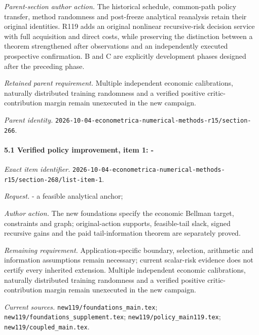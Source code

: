 \emph{Parent-section author action.} The historical schedule, common-path policy transfer, method randomness and post-freeze analytical reanalysis retain their original identities. R119 adds an original nonlinear recursive-risk decision service with full acquisition and direct costs, while preserving the distinction between a theorem strengthened after observations and an independently executed prospective confirmation. B and C are explicitly development phases designed after the preceding phase.

\par\emph{Retained parent requirement.} Multiple independent economic calibrations, naturally distributed training randomness and a verified positive critic-contribution margin remain unexecuted in the new campaign.

\par\emph{Parent identity.} \nolinkurl{2026-10-04-econometrica-numerical-methods-r15/section-266}.

\paragraph{5.1 Verified policy improvement, item 1: -}

\emph{Exact item identifier.} \nolinkurl{2026-10-04-econometrica-numerical-methods-r15/section-268/list-item-1}.

\par\emph{Request.} - a feasible analytical anchor;

\par\emph{Author action.} The new foundations specify the economic Bellman target, constraints and graph; original-action supports, feasible-tail slack, signed recursive gains and the paid tail-information theorem are separately proved.

\par\emph{Remaining requirement.} Application-specific boundary, selection, arithmetic and information assumptions remain necessary; current scalar-risk evidence does not certify every inherited extension. Multiple independent economic calibrations, naturally distributed training randomness and a verified positive critic-contribution margin remain unexecuted in the new campaign.

\par\emph{Current sources.} \nolinkurl{new119/foundations_main.tex}; \nolinkurl{new119/foundations_supplement.tex}; \nolinkurl{new119/policy_main119.tex}; \nolinkurl{new119/coupled_main.tex}.

